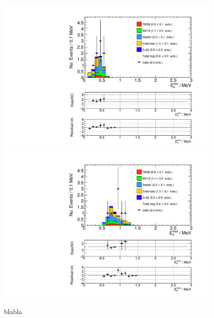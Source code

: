 \documentclass[main.tex]{subfiles}
\begin{document}
\begin{figure} [h!]
\begin{center}
\includegraphics[scale=0.5]{pictures/FinalResults/bb0nu2/150/Eemin_bb0nu2NS.pdf}
\includegraphics[scale=0.5]{pictures/FinalResults/bb0nu2/150/Eemax_bb0nu2NS.pdf}
\end{center}
\caption{blabla}
\label{plot:SEeAndEg250bb0nu2}
\end{figure}
\end{document}
